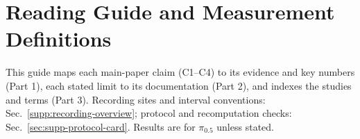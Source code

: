 \section*{Reading Guide and Measurement Definitions}
\label{sec:supp-terms}
\newenvironment{guidelist}{\small\begin{list}{}{\setlength{\leftmargin}{0.9em}\setlength{\itemindent}{-0.9em}\setlength{\itemsep}{0pt}\setlength{\parsep}{0pt}\setlength{\topsep}{1pt}}}{\end{list}}
This guide maps each main-paper claim (C1--C4) to its evidence and key numbers (Part 1), each stated limit to its documentation (Part 2), and indexes the studies and terms (Part 3). Recording sites and interval conventions: Sec.~\ref{supp:recording-overview}; protocol and recomputation checks: Sec.~\ref{sec:supp-protocol-card}. Results are for $\pi_{0.5}$ unless stated.

